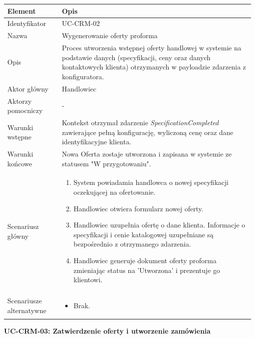 \begin{longtable}{|p{4cm}|p{11cm}|}
\hline
\textbf{Element} & \textbf{Opis} \\
\hline

Identyfikator & UC-CRM-02 \\
\hline

Nazwa & Wygenerowanie oferty proforma \\
\hline

Opis & 
Proces utworzenia wstępnej oferty handlowej w systemie na podstawie danych (specyfikacji, ceny oraz danych kontaktowych klienta) otrzymanych w payloadzie zdarzenia z konfiguratora. \\
\hline

Aktor główny & Handlowiec \\
\hline

Aktorzy pomocniczy & - \\
\hline

Warunki wstępne & 
Kontekst otrzymał zdarzenie \textit{SpecificationCompleted} zawierające pełną konfigurację, wyliczoną cenę oraz dane identyfikacyjne klienta. \\
\hline

Warunki końcowe & 
Nowa Oferta zostaje utworzona i zapisana w systemie ze statusem "W przygotowaniu". \\
\hline

Scenariusz główny & 
\begin{enumerate}
    \item System powiadamia handlowca o nowej specyfikacji oczekującej na ofertowanie.
    \item Handlowiec otwiera formularz nowej oferty.
    \item Handlowiec uzupełnia ofertę o dane klienta. Informacje o specyfikacji i cenie katalogowej uzupełniane są bezpośrednio z otrzymanego zdarzenia.
    \item Handlowiec generuje dokument oferty proforma zmieniając status na 'Utworzona' i prezentuje go klientowi.
\end{enumerate} \\
\hline

Scenariusze alternatywne & 
\begin{itemize}
    \item [] Brak.
\end{itemize} \\
\hline
\end{longtable}

\textbf{UC-CRM-03: Zatwierdzenie oferty i utworzenie zamówienia}

